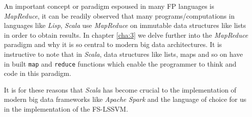 An important concept or paradigm espoused in many FP languages is \textit{MapReduce}, it can be readily observed that many programs/computations in languages like \textit{Lisp}, \textit{Scala} use \textit{MapReduce} on immutable data structures like lists in order to obtain results. In chapter \ref{cha:3} we delve further into the \textit{MapReduce} paradigm and why it is so central to modern big data architectures. It is instructive to note that in \textit{Scala}, data structures like lists, maps and so on have in built \texttt{map} and \texttt{reduce} functions which enable the programmer to think and code in this paradigm.

It is for these reasons that \textit{Scala} has become crucial to the implementation of modern big data frameworks like \textit{Apache Spark} and the language of choice for us in the implementation of the FS-LSSVM.

